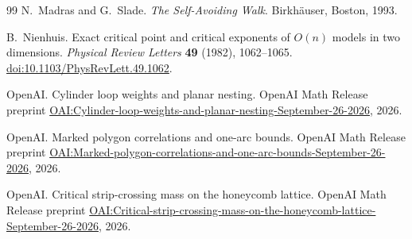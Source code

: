 \begin{thebibliography}{99}
N.~Madras and G.~Slade.
\emph{The Self-Avoiding Walk}.
Birkh\"auser, Boston, 1993.

B.~Nienhuis.
Exact critical point and critical exponents of $O(n)$ models in two dimensions.
\emph{Physical Review Letters} \textbf{49} (1982), 1062--1065.
\href{https://doi.org/10.1103/PhysRevLett.49.1062}{doi:10.1103/PhysRevLett.49.1062}.

OpenAI.
Cylinder loop weights and planar nesting.
OpenAI Math Release preprint
\href{https://github.com/openai/math/blob/main/preprints/Cylinder-loop-weights-and-planar-nesting-September-26-2026/main.pdf}{OAI:Cylinder-loop-weights-and-planar-nesting-September-26-2026},
2026.

OpenAI.
Marked polygon correlations and one-arc bounds.
OpenAI Math Release preprint
\href{https://github.com/openai/math/blob/main/preprints/Marked-polygon-correlations-and-one-arc-bounds-September-26-2026/main.pdf}{OAI:Marked-polygon-correlations-and-one-arc-bounds-September-26-2026},
2026.

OpenAI.
Critical strip-crossing mass on the honeycomb lattice.
OpenAI Math Release preprint
\href{https://github.com/openai/math/blob/main/preprints/Critical-strip-crossing-mass-on-the-honeycomb-lattice-September-26-2026/main.pdf}{OAI:Critical-strip-crossing-mass-on-the-honeycomb-lattice-September-26-2026},
2026.
\end{thebibliography}
